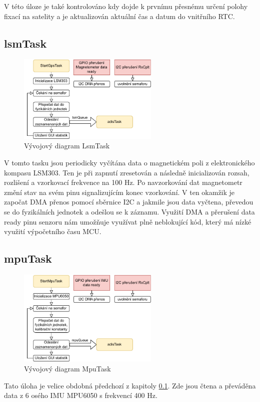 V této úloze je také kontrolováno kdy dojde k prvnímu přesnému určení polohy fixací na satelity a je aktualizován aktuální čas a datum do vnitřního \ac{RTC}.

\subsection{lsmTask} \label{lsmTask}
\begin{figure}[h]
    \centering
    \includegraphics[width=0.6\textwidth]{obrazky/LsmTask}
    \caption{Vývojový diagram LsmTask}
\end{figure}
V tomto tasku jsou periodicky vyčítána data o magnetickém poli z elektronického kompasu LSM303. Ten je při zapnutí zresetován a následně inicializován rozsah, rozlišení a vzorkovací frekvence na 100 Hz. Po navzorkování dat magnetometr změní stav na svém pinu signalizujícím konec vzorkování. V ten okamžik je započat DMA přenos pomocí sběrnice I2C a jakmile jsou data vyčtena, převedou se do fyzikálních jednotek a odešlou se k záznamu. Využití DMA a přerušení data ready pinu senzoru nám umožňuje využívat plně neblokující kód, který má nízké využití výpočetního času MCU.

\subsection{mpuTask}
\begin{figure}[h]
    \centering
    \includegraphics[width=0.6\textwidth]{obrazky/MpuTask}
    \caption{Vývojový diagram MpuTask}
\end{figure}
Tato úloha je velice obdobná předchozí z kapitoly \ref{lsmTask}. Zde jsou čtena a převáděna data z 6 osého IMU MPU6050 s frekvencí 400 Hz.


